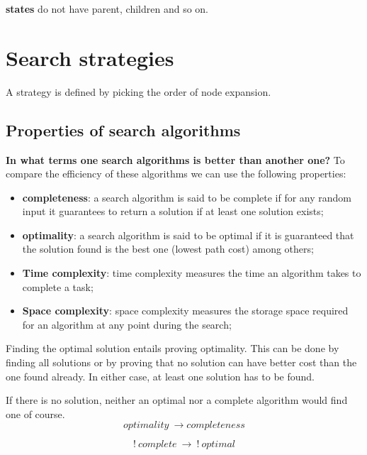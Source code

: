 \documentclass{article}
\begin{document}
\begin{flushleft}
    \textbf{states} do not have parent, children and so on.
\end{flushleft}

\newpage

\section{Search strategies}

A strategy is defined by picking the order of node expansion.

\subsection{Properties of search algorithms}

\textbf{In what terms one search algorithms is better than another one?} To compare the efficiency of these algorithms we can use the following properties:

\begin{itemize}
    \item \textbf{completeness}: a search algorithm is said to be complete if for any random input it guarantees to return a solution if at least one solution exists;
    \item \textbf{optimality}: a search algorithm is said to be optimal if it is guaranteed that the solution found is the best one (lowest path cost) among others; 
    \item \textbf{Time complexity}: time complexity measures the time an algorithm takes to complete a task;
    \item \textbf{Space complexity}: space complexity measures the storage space required for an algorithm at any point during the search;
\end{itemize}

Finding the optimal solution entails proving optimality. This can be done by finding all solutions or by proving that no solution can have better cost than the one found already. In either case, at least one solution has to be found.

If there is no solution, neither an optimal nor a complete algorithm would find one of course.
\begin{equation}
    optimality\ \rightarrow completeness
\end{equation}

\begin{equation}
    !\ complete\ \rightarrow\ !\ optimal
\end{equation}
\end{document}

